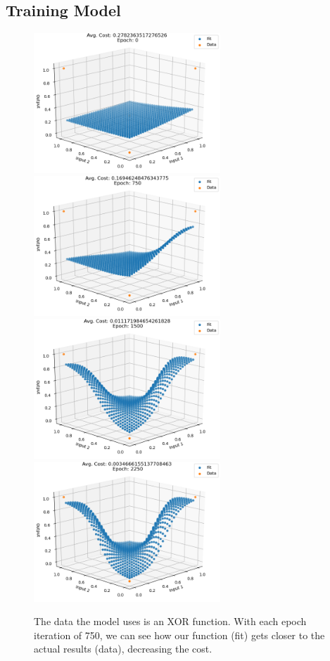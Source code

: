 \subsection{Training Model}
\label{restm}
\begin{figure}[H]
\includegraphics[width=7cm]{images/1.png}
\includegraphics[width=7cm]{images/2.png}
\includegraphics[width=7cm]{images/3.png}
\includegraphics[width=7cm]{images/4.png}
\caption{The data the model uses is an XOR function. With each epoch iteration of 750, we can see how our function (fit) gets closer to the actual results (data), decreasing the cost.}
\end{figure}

